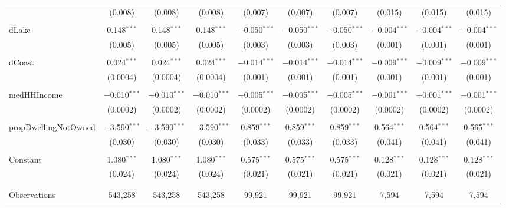 \documentclass{article}
\begin{document}
\begin{table}[!htbp]
\begin{tabular}{@{\extracolsep{5pt}}lccccccccc}
  & (0.008) & (0.008) & (0.008) & (0.007) & (0.007) & (0.007) & (0.015) & (0.015) & (0.015) \\ 
  & & & & & & & & & \\ 
 dLake & 0.148$^{***}$ & 0.148$^{***}$ & 0.148$^{***}$ & $-$0.050$^{***}$ & $-$0.050$^{***}$ & $-$0.050$^{***}$ & $-$0.004$^{***}$ & $-$0.004$^{***}$ & $-$0.004$^{***}$ \\ 
  & (0.005) & (0.005) & (0.005) & (0.003) & (0.003) & (0.003) & (0.001) & (0.001) & (0.001) \\ 
  & & & & & & & & & \\ 
 dCoast & 0.024$^{***}$ & 0.024$^{***}$ & 0.024$^{***}$ & $-$0.014$^{***}$ & $-$0.014$^{***}$ & $-$0.014$^{***}$ & $-$0.009$^{***}$ & $-$0.009$^{***}$ & $-$0.009$^{***}$ \\ 
  & (0.0004) & (0.0004) & (0.0004) & (0.001) & (0.001) & (0.001) & (0.001) & (0.001) & (0.001) \\ 
  & & & & & & & & & \\ 
 medHHIncome & $-$0.010$^{***}$ & $-$0.010$^{***}$ & $-$0.010$^{***}$ & $-$0.005$^{***}$ & $-$0.005$^{***}$ & $-$0.005$^{***}$ & $-$0.001$^{***}$ & $-$0.001$^{***}$ & $-$0.001$^{***}$ \\ 
  & (0.0002) & (0.0002) & (0.0002) & (0.0002) & (0.0002) & (0.0002) & (0.0002) & (0.0002) & (0.0002) \\ 
  & & & & & & & & & \\ 
 propDwellingNotOwned & $-$3.590$^{***}$ & $-$3.590$^{***}$ & $-$3.590$^{***}$ & 0.859$^{***}$ & 0.859$^{***}$ & 0.859$^{***}$ & 0.564$^{***}$ & 0.564$^{***}$ & 0.565$^{***}$ \\ 
  & (0.030) & (0.030) & (0.030) & (0.033) & (0.033) & (0.033) & (0.041) & (0.041) & (0.041) \\ 
  & & & & & & & & & \\ 
 Constant & 1.080$^{***}$ & 1.080$^{***}$ & 1.080$^{***}$ & 0.575$^{***}$ & 0.575$^{***}$ & 0.575$^{***}$ & 0.128$^{***}$ & 0.128$^{***}$ & 0.128$^{***}$ \\ 
  & (0.024) & (0.024) & (0.024) & (0.021) & (0.021) & (0.021) & (0.021) & (0.021) & (0.021) \\ 
  & & & & & & & & & \\ 
\hline \\[-1.8ex] 
Observations & 543,258 & 543,258 & 543,258 & 99,921 & 99,921 & 99,921 & 7,594 & 7,594 & 7,594 \\ 

\end{tabular}
\end{table}
\end{document}
